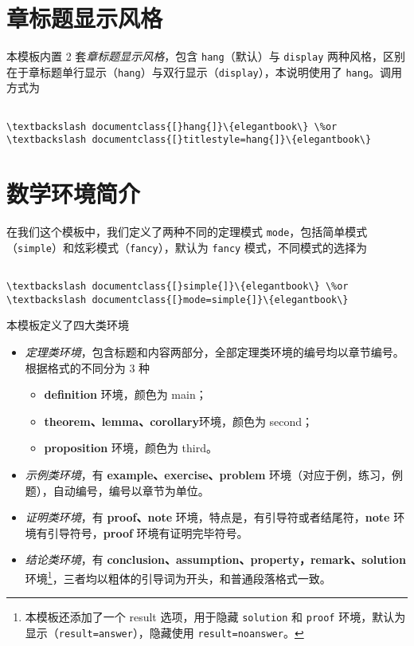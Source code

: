 \documentclass[cn,11pt,fancy,hide]{elegantbook}
\providecommand{\tightlist}{%
  \setlength{\itemsep}{0pt}\setlength{\parskip}{0pt}}
\let\rmarkdownfootnote\footnote%
\def\footnote{\protect\rmarkdownfootnote}
\begin{document}
\hypertarget{section-3}{%
\section{章标题显示风格}\label{section-3}}

本模板内置 2 套\emph{章标题显示风格}，包含 \texttt{hang}（默认）与 \texttt{display} 两种风格，区别在于章标题单行显示（\texttt{hang}）与双行显示（\texttt{display}），本说明使用了 \texttt{hang}。调用方式为

\begin{lstlisting}

\textbackslash documentclass{[}hang{]}\{elegantbook\} \%or
\textbackslash documentclass{[}titlestyle=hang{]}\{elegantbook\}

\end{lstlisting}

\hypertarget{section-4}{%
\section{数学环境简介}\label{section-4}}

在我们这个模板中，我们定义了两种不同的定理模式 \texttt{mode}，包括简单模式（\texttt{simple}）和炫彩模式（\texttt{fancy}），默认为 \texttt{fancy} 模式，不同模式的选择为

\begin{lstlisting}

\textbackslash documentclass{[}simple{]}\{elegantbook\} \%or
\textbackslash documentclass{[}mode=simple{]}\{elegantbook\}

\end{lstlisting}

本模板定义了四大类环境

\begin{itemize}
\item
  \emph{定理类环境}，包含标题和内容两部分，全部定理类环境的编号均以章节编号。根据格式的不同分为 3 种

  \begin{itemize}
  \tightlist
  \item
    \textbf{definition} 环境，颜色为 main；
  \item
    \textbf{theorem、lemma、corollary}环境，颜色为 second；
  \item
    \textbf{proposition} 环境，颜色为 third。
  \end{itemize}
\item
  \emph{示例类环境}，有 \textbf{example、exercise、problem} 环境（对应于例，练习，例题），自动编号，编号以章节为单位。
\item
  \emph{证明类环境}，有 \textbf{proof、note} 环境，特点是，有引导符或者结尾符，\textbf{note} 环境有引导符号，\textbf{proof} 环境有证明完毕符号。
\item
  \emph{结论类环境}，有 \textbf{conclusion、assumption、property，remark、solution} 环境\footnote{本模板还添加了一个 result 选项，用于隐藏 \texttt{solution} 和 \texttt{proof} 环境，默认为显示（\texttt{result=answer}），隐藏使用 \texttt{result=noanswer}。}，三者均以粗体的引导词为开头，和普通段落格式一致。
\end{itemize}
\end{document}
